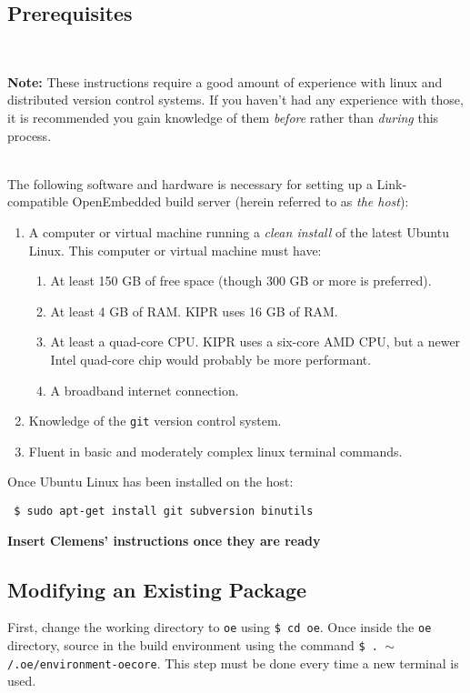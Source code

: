 \documentclass[12pt,letterpaper]{article}
\newcommand{\bcolorbox}[4]{\noindent \\ \fcolorbox{#1}{#2} {\parbox{\textwidth}{\vspace{.1em}\textbf{#3} #4\vspace{.1em}}} \\}
\newcommand{\note}[1]{\bcolorbox{yellow}{Seashell}{Note:}{#1}}
\begin{document}
	\subsection{Prerequisites}
	\note{These instructions require a good amount of experience with linux and distributed version control systems. If you haven't had
	any experience with those, it is recommended you gain knowledge of them \emph{before} rather than \emph{during} this process.}
	
	The following software and hardware is necessary for setting up a Link-compatible OpenEmbedded build server (herein referred to as
	\emph{the host}):
	
	\begin{enumerate}
		\setlength{\itemsep}{0em}
		\item A computer or virtual machine running a \emph{clean install} of the latest Ubuntu Linux. This computer or virtual machine must have:
		\begin{enumerate}
			\setlength{\itemsep}{0em}
			\item At least 150 GB of free space (though 300 GB or more is preferred).
			\item At least 4 GB of RAM. KIPR uses 16 GB of RAM.
			\item At least a quad-core CPU. KIPR uses a six-core AMD CPU, but a newer Intel quad-core
			chip would probably be more performant.
			\item A broadband internet connection.
		\end{enumerate}
		\item Knowledge of the \texttt{git} version control system.
		\item Fluent in basic and moderately complex linux terminal commands.
	\end{enumerate}
	
	Once Ubuntu Linux has been installed on the host:
	
	\texttt{
\$ sudo apt-get install git subversion binutils
	}
	
	\textbf{Insert Clemens' instructions once they are ready}
	
	\subsection{Modifying an Existing Package}
	
	First, change the working directory to \texttt{oe} using \texttt{\$ cd oe}. Once inside the \texttt{oe} directory, source in the build
	environment using the command \texttt{\$ . $\sim$/.oe/environment-oecore}. This step must be done every time a new terminal is used.
	
\end{document}
